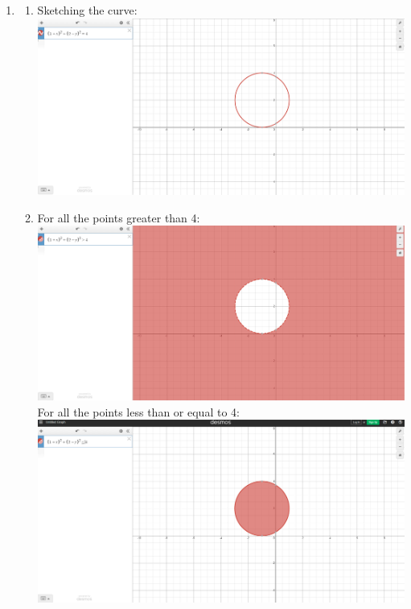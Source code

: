 \documentclass[12pt]{exam}
\begin{document}
\begin{enumerate}
    \item 
    \begin{enumerate}
        \item Sketching the curve: \\
        \includegraphics[scale = .3]{2a.png}
        
        \item For all the points greater than 4: \\ \includegraphics[scale = .3]{2b.png}\\
        For all the points less than or equal to 4: \\ \includegraphics[scale = .3]{2b1.png}\\


\end{enumerate}
\end{enumerate}
\end{document}
